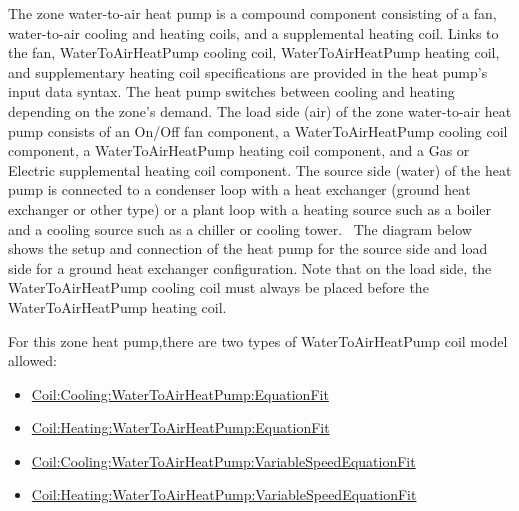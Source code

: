 The zone water-to-air heat pump is a compound component consisting of a fan, water-to-air cooling and heating coils, and a supplemental heating coil. Links to the fan, WaterToAirHeatPump cooling coil, WaterToAirHeatPump heating coil, and supplementary heating coil specifications are provided in the heat pump's input data syntax. The heat pump switches between cooling and heating depending on the zone's demand. The load side (air) of the zone water-to-air heat pump consists of an On/Off fan component, a WaterToAirHeatPump cooling coil component, a WaterToAirHeatPump heating coil component, and a Gas or Electric supplemental heating coil component. The source side (water) of the heat pump is connected to a condenser loop with a heat exchanger (ground heat exchanger or other type) or a plant loop with a heating source such as a boiler and a cooling source such as a chiller or cooling tower.~ The diagram below shows the setup and connection of the heat pump for the source side and load side for a ground heat exchanger configuration. Note that on the load side, the WaterToAirHeatPump cooling coil must always be placed before the WaterToAirHeatPump heating coil.

For this zone heat pump,there are two types of WaterToAirHeatPump coil model allowed:

\begin{itemize}
\item
  \hyperref[coilcoolingwatertoairheatpumpequationfit]{Coil:Cooling:WaterToAirHeatPump:EquationFit}
\item
  \hyperref[coilheatingwatertoairheatpumpequationfit]{Coil:Heating:WaterToAirHeatPump:EquationFit}
\item
  \hyperref[coilcoolingwatertoairheatpumpvariablespeedequationfit]{Coil:Cooling:WaterToAirHeat\hyperref[pumpvariablespeed]{Pump:VariableSpeed}EquationFit}
\item
  \hyperref[coilheatingwatertoairheatpumpvariablespeedequationfit]{Coil:Heating:WaterToAirHeat\hyperref[pumpvariablespeed]{Pump:VariableSpeed}EquationFit}
\end{itemize}

